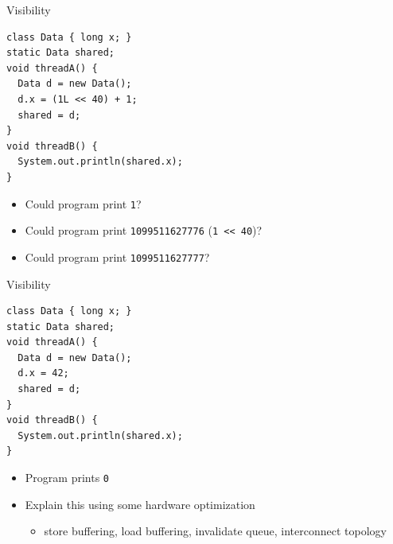 \begin{frame}{Visibility}

\begin{verbatim}
class Data { long x; }
static Data shared;
void threadA() {
  Data d = new Data();
  d.x = (1L << 40) + 1;
  shared = d;
}
void threadB() {
  System.out.println(shared.x);
}
\end{verbatim}

\begin{itemize}
  \pause \item Could program print \texttt{1}?
  \pause \item Could program print \texttt{1099511627776} (\texttt{1 << 40})?
  \pause \item Could program print \texttt{1099511627777}?
\end{itemize}

\end{frame}


\begin{frame}{Visibility}

\begin{verbatim}
class Data { long x; }
static Data shared;
void threadA() {
  Data d = new Data();
  d.x = 42;
  shared = d;
}
void threadB() {
  System.out.println(shared.x);
}
\end{verbatim}

\pause

\begin{itemize}
  \item Program prints \texttt{0}
  \item Explain this using some hardware optimization 
  \begin{itemize}
    \item store buffering, load buffering, invalidate queue, interconnect topology
  \end{itemize}
\end{itemize}
\end{frame}


